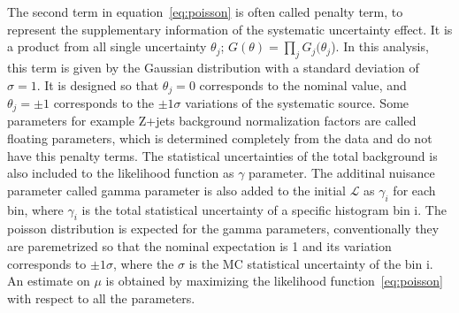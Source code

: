 The second term in equation~\ref{eq:poisson} is often called penalty term, to represent the supplementary information of the systematic uncertainty effect. It is a product from all single uncertainty $\theta_j$; $G(\theta) = \prod_{j}G_{j}(\theta_{j}$). 
In this analysis, this term is given by the Gaussian distribution with a standard deviation of $\sigma = 1$. It is designed so that $\theta_j = 0$ corresponds to the nominal value, and $\theta_j = \pm 1$ corresponds to the $\pm 1 \sigma$ variations of the systematic source. 
Some parameters for example Z+jets background normalization factors are called floating parameters, which is determined completely from the data and do not have this penalty terms.
The statistical uncertainties of the total background is also included to the likelihood function as $\gamma$ parameter. 
The additinal nuisance parameter called gamma parameter is also added to the initial $\mathcal{L}$ as $\gamma_i$ for each bin, where $\gamma_i$ is the total statistical uncertainty of a specific histogram bin i. 
The poisson distribution is expected for the gamma parameters, conventionally they are paremetrized so that the nominal expectation is 1 and its variation corresponds to $\pm 1 \sigma$, where the $\sigma$ is the MC statistical uncertainty of the bin i.
An estimate on $\mu$ is obtained by maximizing the likelihood function~\ref{eq:poisson} with respect to all the parameters.  

